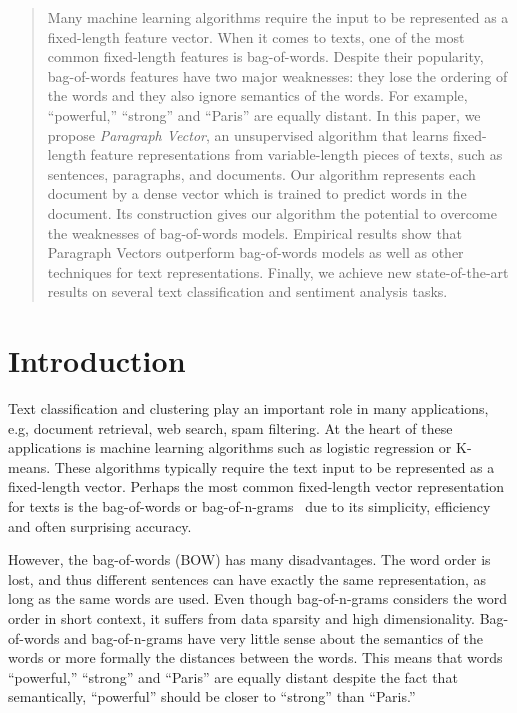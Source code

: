 \documentclass{article}
\begin{document}

\begin{abstract}
Many machine learning algorithms require the input to be represented
as a fixed-length feature vector. When it comes to texts, one of the
most common fixed-length features is bag-of-words. Despite their
popularity, bag-of-words features have two major weaknesses: they lose
the ordering of the words and they also ignore semantics of the
words. For example, ``powerful,'' ``strong'' and ``Paris'' are equally
distant.  In this paper, we propose \emph{Paragraph Vector}, an
unsupervised algorithm that learns fixed-length feature
representations from variable-length pieces of texts, such as
sentences, paragraphs, and documents.  Our algorithm represents each
document by a dense vector which is trained to predict words in the
document. Its construction gives our algorithm the potential to
overcome the weaknesses of bag-of-words models. Empirical results show
that Paragraph Vectors outperform bag-of-words models as well as
other techniques for text representations. Finally, we achieve new
state-of-the-art results on several text classification and sentiment
analysis tasks.
\end{abstract}

\section{Introduction}
\label{sec:intro}

Text classification and clustering play an important role in many
applications, e.g, document retrieval, web search, spam filtering. At
the heart of these applications is machine learning algorithms such as
logistic regression or K-means. These algorithms typically require the
text input to be represented as a fixed-length vector. Perhaps the
most common fixed-length vector representation for texts is the
bag-of-words or bag-of-n-grams~\cite{harris54} due to its simplicity,
efficiency and often surprising accuracy.

However, the bag-of-words (BOW) has many disadvantages.  The word
order is lost, and thus different sentences can have exactly the same
representation, as long as the same words are used. Even though
bag-of-n-grams considers the word order in short context, it suffers
from data sparsity and high dimensionality. Bag-of-words and
bag-of-n-grams have very little sense about the semantics of the words
or more formally the distances between the words. This means that
words ``powerful,'' ``strong'' and ``Paris'' are equally distant
despite the fact that semantically, ``powerful'' should be closer to
``strong'' than ``Paris.''
\end{document}
